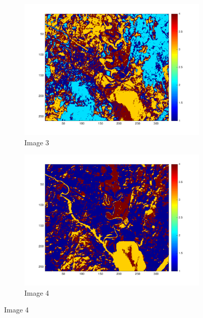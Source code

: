 \documentclass[12pt,a4paper]{report}
\begin{document}
\begin{figure}[!ht]
	\begin{subfigure}{0.5\textwidth}
	\centering
	\includegraphics[width=1.0\textwidth]{Feature3ClassificationResult}	
	\caption*{Image 3}
	\end{subfigure} 
	\begin{subfigure}{0.5\textwidth}
	\centering
	\includegraphics[width=1.0\textwidth]{Feature4ClassificationResult}	
	\caption*{Image 4}
	\end{subfigure}
\end{figure}
\end{document}

